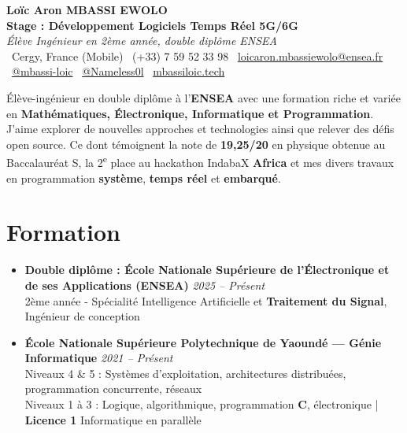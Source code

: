 \documentclass[a4paper,11pt]{article}
\begin{document}
\begin{center}
    {\Large \textbf{Loïc Aron MBASSI EWOLO}} \\ \vspace{4pt}
    \textbf{\large Stage : Développement Logiciels Temps Réel 5G/6G} \\
    \textit{\small Élève Ingénieur en 2ème année, double diplôme ENSEA} \\ \vspace{4pt}
    \small
    \faMapMarker\ Cergy, France (Mobile) \quad
    \faPhone\ (+33) 7 59 52 33 98 \quad
    \faEnvelope\ \href{mailto:loicaron.mbassiewolo@ensea.fr}{loicaron.mbassiewolo@ensea.fr} \\ \vspace{2pt}
    \faLinkedin\ \href{https://www.linkedin.com/in/mbassi-loic-3942a9246/}{@mbassi-loic} \quad
    \faGithub\ \href{https://github.com/Nameless0l}{@Nameless0l} \quad
    \faGlobe\ \href{https://mbassiloic.tech}{mbassiloic.tech}
\end{center}

\vspace{-8pt}

\noindent\small{Élève-ingénieur en double diplôme à l'\textbf{ENSEA} avec une formation riche et variée en \textbf{Mathématiques, Électronique, Informatique et Programmation}. 
J'aime explorer de nouvelles approches et technologies ainsi que relever des défis open source. 
Ce dont témoignent la note de \textbf{19,25/20} en physique obtenue au Baccalauréat S, la 2\textsuperscript{e} place au hackathon IndabaX \textbf{Africa} et mes divers travaux en programmation \textbf{système}, \textbf{temps réel} et \textbf{embarqué}.}

\vspace{4pt}

\section{Formation}
\begin{itemize}[leftmargin=*, label={.}, nosep]
    \item \textbf{Double diplôme : École Nationale Supérieure de l'Électronique et de ses Applications (ENSEA)} \hfill \textit{2025 -- Présent} \\
    \small{2ème année - Spécialité Intelligence Artificielle et \textbf{Traitement du Signal}, Ingénieur de conception}
    \vspace{2pt}
    \item \textbf{École Nationale Supérieure Polytechnique de Yaoundé — Génie Informatique} \hfill \textit{2021 -- Présent} \\
    \small{Niveaux 4 \& 5 : Systèmes d'exploitation, architectures distribuées, programmation concurrente, réseaux} \\
    \small{Niveaux 1 à 3 : Logique, algorithmique, programmation \textbf{C}, électronique | \textbf{Licence 1} Informatique en parallèle}
\end{itemize}
\end{document}
